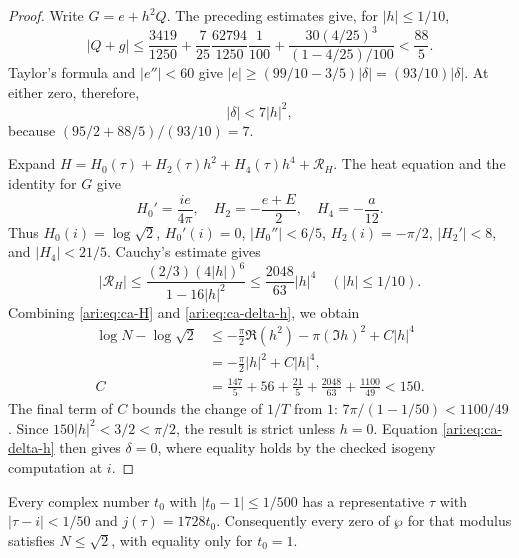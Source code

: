 \begin{proof}
Write $G=e+h^2Q$. The preceding estimates give, for $|h|\le1/10$,
\[
 |Q+g|\le
 \frac{3419}{1250}+\frac7{25}\frac{62794}{1250}\frac1{100}
       +\frac{30(4/25)^3}{(1-4/25)/100}<\frac{88}{5}.
\]
Taylor's formula and $|e''|<60$ give
$|e|\ge(99/10-3/5)|\delta|=(93/10)|\delta|$.
At either zero, therefore,
\begin{equation}\label{ari:eq:ca-delta-h}
 |\delta|<7|h|^2,
\end{equation}
because $(95/2+88/5)/(93/10)=7$.

Expand
$H=H_0(\tau)+H_2(\tau)h^2+H_4(\tau)h^4+\mathcal R_H$.
The heat equation and the identity for $G$ give
\[
 H_0'=\frac{ie}{4\pi},\quad
 H_2=-\frac{e+E}{2},\quad H_4=-\frac a{12}.
\]
Thus $H_0(i)=\log\sqrt2$, $H_0'(i)=0$,
$|H_0''|<6/5$, $H_2(i)=-\pi/2$, $|H_2'|<8$, and
$|H_4|<21/5$. Cauchy's estimate gives
\[
 |\mathcal R_H|\le
 \frac{(2/3)(4|h|)^6}{1-16|h|^2}
 \le\frac{2048}{63}|h|^4
 \quad (|h|\le1/10).
\]
Combining \eqref{ari:eq:ca-H} and \eqref{ari:eq:ca-delta-h}, we obtain
\begin{align*}
 \log N-\log\sqrt2
 &\le-\frac\pi2\Re(h^2)-\pi(\Im h)^2+C|h|^4\\
 &=-\frac\pi2|h|^2+C|h|^4,\\
 C&=\frac{147}{5}+56+\frac{21}{5}
                 +\frac{2048}{63}+\frac{1100}{49}<150.
\end{align*}
The final term of $C$ bounds the change of $1/T$ from $1$:
$7\pi/(1-1/50)<1100/49$. Since $150|h|^2<3/2<\pi/2$,
the result is strict unless $h=0$. Equation
\eqref{ari:eq:ca-delta-h} then gives $\delta=0$, where equality
holds by the checked isogeny computation at $i$.
\end{proof}

\begin{proposition}\label{ari:C.8.3}
Every complex number $t_0$ with $|t_0-1|\le1/500$ has a
representative $\tau$ with $|\tau-i|<1/50$ and $j(\tau)=1728t_0$.
Consequently every zero of $\wp$ for that modulus satisfies
$N\le\sqrt2$, with equality only for $t_0=1$.
\end{proposition}

